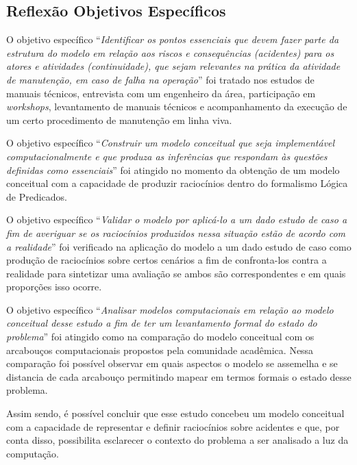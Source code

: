\subsection{Reflexão Objetivos Específicos}\label{reflexobespecifico}


O objetivo específico ``\textit{Identificar os pontos essenciais que devem fazer parte da estrutura do modelo em relação aos riscos e consequências (acidentes) para os atores e atividades (continuidade), que sejam relevantes na prática da atividade de manutenção, em caso de falha na operação}'' foi tratado nos estudos de manuais técnicos, entrevista com um engenheiro da área, participação em \textit{workshops}, levantamento de manuais técnicos e acompanhamento da execução de um certo procedimento de manutenção em linha viva.  

O objetivo específico ``\textit{Construir um modelo conceitual que seja implementável computacionalmente e que produza as inferências que respondam às questões definidas como essenciais}'' foi atingido no momento da obtenção de um modelo conceitual com a capacidade de produzir raciocínios dentro do formalismo Lógica de Predicados. 

O objetivo específico ``\textit{Validar o modelo por aplicá-lo a um dado estudo de caso a fim de averiguar se os raciocínios produzidos nessa situação estão de acordo com a realidade}'' foi verificado na aplicação do modelo a um dado estudo de caso como produção de raciocínios sobre certos cenários a fim de confronta-los contra a realidade para sintetizar uma avaliação se ambos são correspondentes e em quais proporções isso ocorre. 

O objetivo específico ``\textit{Analisar modelos computacionais em relação ao modelo conceitual desse estudo a fim de ter um levantamento formal do estado do problema}'' foi atingido como na comparação do modelo conceitual com os arcabouços computacionais propostos pela comunidade acadêmica. Nessa comparação foi possível observar em quais aspectos o modelo se assemelha e se distancia de cada arcabouço permitindo mapear em termos formais o estado desse problema. 

Assim sendo, é possível concluir que esse estudo concebeu um modelo conceitual com a capacidade de representar e definir raciocínios sobre acidentes e que, por conta disso, possibilita esclarecer o contexto do problema a ser analisado a luz da computação. 